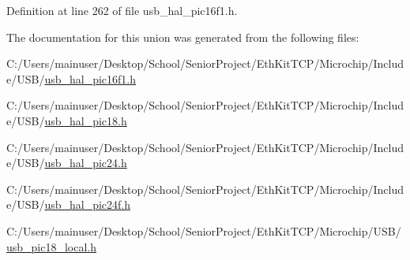 Definition at line 262 of file usb\+\_\+hal\+\_\+pic16f1.\+h.



The documentation for this union was generated from the following files\+:\begin{DoxyCompactItemize}
\item 
C\+:/\+Users/mainuser/\+Desktop/\+School/\+Senior\+Project/\+Eth\+Kit\+T\+C\+P/\+Microchip/\+Include/\+U\+S\+B/\hyperlink{usb__hal__pic16f1_8h}{usb\+\_\+hal\+\_\+pic16f1.\+h}\item 
C\+:/\+Users/mainuser/\+Desktop/\+School/\+Senior\+Project/\+Eth\+Kit\+T\+C\+P/\+Microchip/\+Include/\+U\+S\+B/\hyperlink{usb__hal__pic18_8h}{usb\+\_\+hal\+\_\+pic18.\+h}\item 
C\+:/\+Users/mainuser/\+Desktop/\+School/\+Senior\+Project/\+Eth\+Kit\+T\+C\+P/\+Microchip/\+Include/\+U\+S\+B/\hyperlink{usb__hal__pic24_8h}{usb\+\_\+hal\+\_\+pic24.\+h}\item 
C\+:/\+Users/mainuser/\+Desktop/\+School/\+Senior\+Project/\+Eth\+Kit\+T\+C\+P/\+Microchip/\+Include/\+U\+S\+B/\hyperlink{usb__hal__pic24f_8h}{usb\+\_\+hal\+\_\+pic24f.\+h}\item 
C\+:/\+Users/mainuser/\+Desktop/\+School/\+Senior\+Project/\+Eth\+Kit\+T\+C\+P/\+Microchip/\+U\+S\+B/\hyperlink{usb__pic18__local_8h}{usb\+\_\+pic18\+\_\+local.\+h}\end{DoxyCompactItemize}
